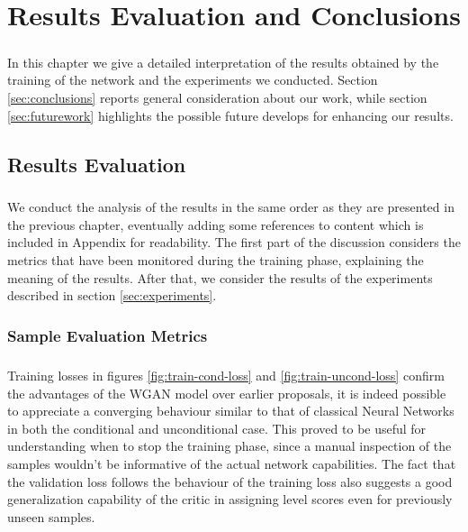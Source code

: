 \chapter{Results Evaluation and Conclusions}
\label{ch:results-conclusion}
\paragraph{} In this chapter we give a detailed interpretation of the results obtained by the training of the network and the experiments we conducted. Section \ref{sec:conclusions} reports general consideration about our work, while section \ref{sec:futurework} highlights the possible future develops for enhancing our results.

\section{Results Evaluation}

\paragraph{} We conduct the analysis of the results in the same order as they are presented in the previous chapter, eventually adding some references to content which is included in Appendix for readability. The first part of the discussion considers the metrics that have been monitored during the training phase, explaining the meaning of the results. After that, we consider the results of the experiments described in section \ref{sec:experiments}.
\subsection{Sample Evaluation Metrics}
\paragraph{} Training losses in figures \ref{fig:train-cond-loss} and \ref{fig:train-uncond-loss} confirm the advantages of the WGAN model over earlier proposals, it is indeed possible to appreciate a converging behaviour similar to that of classical Neural Networks in both the conditional and unconditional case. This proved to be useful for understanding when to stop the training phase, since a manual inspection of the samples wouldn't be informative of the actual network capabilities. The fact that the validation loss follows the behaviour of the training loss also suggests a good generalization capability of the critic in assigning level scores even for previously unseen samples. 

